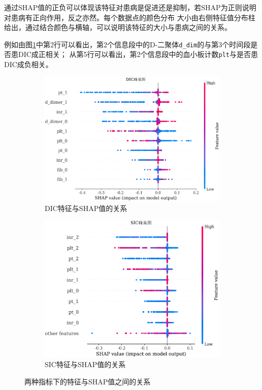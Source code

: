 \documentclass[12pt, a4paper, oneside]{ctexart}
\numberwithin{equation}{section}  %
\begin{document}
通过SHAP值的正负可以体现该特征对患病是促进还是抑制，若SHAP为正则说明对患病有正向作用，反之亦然。每个数据点的颜色分布
大小由右侧特征值分布柱给出，通过结合颜色与横轴，可以说明该特征的大小与患病之间的关系。

例如由图\ref{fig-shap-dic}中第2行可以看出，第2个信息段中的D-二聚体\texttt{d\_dim}的与第3个时间段是否患DIC成正相关；
从第5行可以看出，第2个信息段中的血小板计数\texttt{plt}与是否患DIC成负相关。
\begin{figure}[H]
   \hspace{-1.7cm}
   \begin{subfigure}[b]{0.55\textwidth}
       \includegraphics[scale=0.2]{SHAP/shap_dic_beeswarm}
       \caption{DIC特征与SHAP值的关系}
       \label{fig-shap-dic}
   \end{subfigure}
   \begin{subfigure}[b]{0.6\textwidth}
       \includegraphics[scale=0.2]{SHAP/shap_sic_beeswarm}
       \caption{SIC特征与SHAP值的关系}
   \end{subfigure}
   \caption{两种指标下的特征与SHAP值之间的关系}
   \label{fig-shap-total}
\end{figure}
\end{document}
